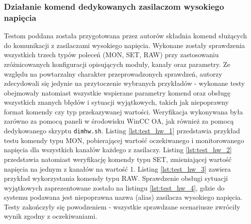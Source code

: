 \subsubsection*{Działanie komend dedykowanych zasilaczom wysokiego napięcia}
Testom poddana została przygotowana przez autorów składnia komend służących do komunikacji z zasilaczami wysokiego napięcia. Wykonane zostały sprawdzenia wszystkich trzech typów poleceń (MON, SET, RAW) przy zastosowaniu zróżnicowanych konfiguracji opisujących moduły, kanały oraz parametry. Ze względu na powtarzalny charakter przeprowadzonych sprawdzeń, autorzy zdecydowali się jedynie na przytoczenie wybranych przykładów - wykonane testy obejmowały natomiast wszystkie wspierane parametry komend oraz obsługę wszystkich znanych błędów i sytuacji wyjątkowych, takich jak niepoprawny format komendy czy typ przekazywanej wartości. Weryfikacja wykonywana była zarówno za pomocą paneli w środowisku WinCC OA, jak również za pomocą dedykowanego skryptu \lstinline{dimhw.sh}. Listing \ref{lst:test_hw_1} przedstawia przykład testu komendy typu MON, pobierającej wartość oczekiwanego i monitorowanego napięcia dla wszystkich kanałów każdego z zasilaczy. Listing \ref{lst:test_hw_2} przedstawia natomiast weryfikację komendy typu SET, zmieniającej wartość napięcia na jednym z kanałów na wartość 1. Listing \ref{lst:test_hw_3} zawiera przykład wykorzystania komendy typu RAW. Sprawdzenie obsługi sytuacji wyjątkowych zaprezentowane zostało na listingu \ref{lst:test_hw_4}, gdzie do systemu podawana jest niepoprawna nazwa (alias) zasilacza wysokiego napięcia. Testy zakończyły się powodzeniem - wszystkie sprawdzane scenariusze zwróciły wynik zgodny z oczekiwaniami.







